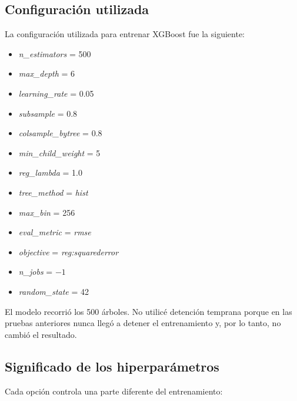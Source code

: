 \documentclass[a4paper,12pt,twocolumn]{report}
\begin{document}
\subsection{Configuración utilizada}

La configuración utilizada para entrenar XGBoost fue la siguiente:

\begin{itemize}
	\item \textit{n\_estimators} = 500
	\item \textit{max\_depth} = 6
	\item \textit{learning\_rate} = 0.05
	\item \textit{subsample} = 0.8
	\item \textit{colsample\_bytree} = 0.8
	\item \textit{min\_child\_weight} = 5
	\item \textit{reg\_lambda} = 1.0
	\item \textit{tree\_method} = \textit{hist}
	\item \textit{max\_bin} = 256
	\item \textit{eval\_metric} = \textit{rmse}
	\item \textit{objective} = \textit{reg:squarederror}
	\item \textit{n\_jobs} = $-1$
	\item \textit{random\_state} = 42
\end{itemize}

El modelo recorrió los 500 árboles. No utilicé detención temprana porque en las pruebas anteriores nunca llegó a detener el entrenamiento y, por lo tanto, no cambió el resultado.

\subsection{Significado de los hiperparámetros}

Cada opción controla una parte diferente del entrenamiento:
\end{document}
